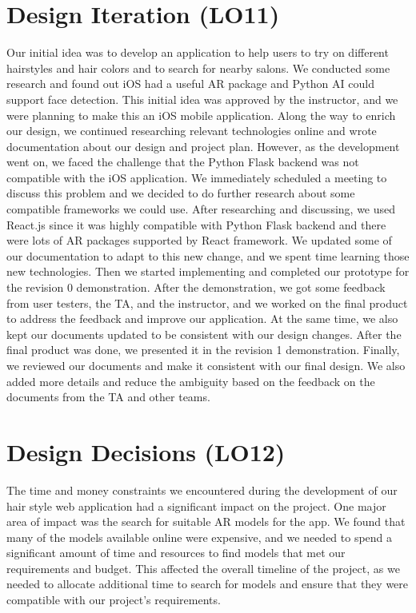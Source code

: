 \documentclass{article}
\begin{document}
\section{Design Iteration (LO11)}

Our initial idea was to develop an application to help users to try on different hairstyles and hair colors and to search for nearby salons. We conducted some research and found out iOS had a useful AR package and Python AI could support face detection. This initial idea was approved by the instructor, and we were planning to make this an iOS mobile application. Along the way to enrich our design, we continued researching relevant technologies online and wrote documentation about our design and project plan. However, as the development went on, we faced the challenge that the Python Flask backend was not compatible with the iOS application. We immediately scheduled a meeting to discuss this problem and we decided to do further research about some compatible frameworks we could use. After researching and discussing, we used React.js since it was highly compatible with Python Flask backend and there were lots of AR packages supported by React framework. We updated some of our documentation to adapt to this new change, and we spent time learning those new technologies. Then we started implementing and completed our prototype for the revision 0 demonstration. After the demonstration, we got some feedback from user testers, the TA, and the instructor, and we worked on the final product to address the feedback and improve our application. At the same time, we also kept our documents updated to be consistent with our design changes. After the final product was done, we presented it in the revision 1 demonstration. Finally, we reviewed our documents and make it consistent with our final design. We also added more details and reduce the ambiguity based on the feedback on the documents from the TA and other teams. 



\section{Design Decisions (LO12)}
The time and money constraints we encountered during the development of our hair style web application had a significant impact on the project. One major area of impact was the search for suitable AR models for the app. We found that many of the models available online were expensive, and we needed to spend a significant amount of time and resources to find models that met our requirements and budget. This affected the overall timeline of the project, as we needed to allocate additional time to search for models and ensure that they were compatible with our project's requirements.
\end{document}

